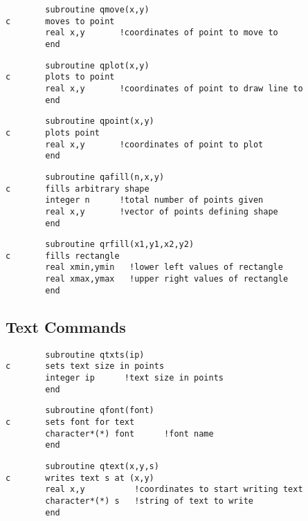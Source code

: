 \documentclass{article}
\begin{document}
\begin{verbatim}
        subroutine qmove(x,y)
c       moves to point
        real x,y       !coordinates of point to move to
        end
\end{verbatim}

\begin{verbatim}
        subroutine qplot(x,y)
c       plots to point
        real x,y       !coordinates of point to draw line to
        end
\end{verbatim}

\begin{verbatim}
        subroutine qpoint(x,y)
c       plots point
        real x,y       !coordinates of point to plot
        end
\end{verbatim}

\begin{verbatim}
        subroutine qafill(n,x,y)
c       fills arbitrary shape
        integer n      !total number of points given
        real x,y       !vector of points defining shape
        end
\end{verbatim}

\begin{verbatim}
        subroutine qrfill(x1,y1,x2,y2)
c       fills rectangle
        real xmin,ymin   !lower left values of rectangle
        real xmax,ymax   !upper right values of rectangle
        end
\end{verbatim}


\subsection{Text Commands}


\begin{verbatim}
        subroutine qtxts(ip)
c       sets text size in points
        integer ip      !text size in points
        end
\end{verbatim}

\begin{verbatim}
        subroutine qfont(font)
c       sets font for text
        character*(*) font      !font name
        end
\end{verbatim}

\begin{verbatim}
        subroutine qtext(x,y,s)
c       writes text s at (x,y)
        real x,y          !coordinates to start writing text
        character*(*) s   !string of text to write
        end
\end{verbatim}
\end{document}
